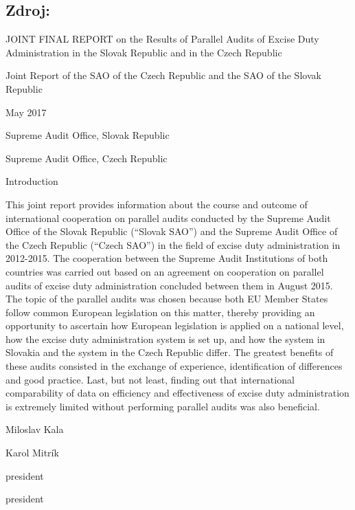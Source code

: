 \documentclass[10pt]{article}
\begin{document}
\subsection*{Zdroj:}



JOINT FINAL REPORT on the Results of Parallel Audits of Excise Duty Administration in the Slovak Republic and in the Czech Republic



Joint Report of the SAO of the Czech Republic and the SAO of the Slovak Republic



May 2017



Supreme Audit Office, Slovak Republic



Supreme Audit Office, Czech Republic



Introduction

This joint report provides information about the course and outcome of international cooperation on parallel audits conducted by the Supreme Audit Office of the Slovak Republic (“Slovak SAO”) and the Supreme Audit Office of the Czech Republic (“Czech SAO”) in the field of excise duty administration in 2012-2015.
The cooperation between the Supreme Audit Institutions of both countries was carried out based on an agreement on cooperation on parallel audits of excise duty administration concluded between them in August 2015.
The topic of the parallel audits was chosen because both EU Member States follow common European legislation on this matter, thereby providing an opportunity to ascertain how European legislation is applied on a national level, how the excise duty administration system is set up, and how the system in Slovakia and the system in the Czech Republic differ.
The greatest benefits of these audits consisted in the exchange of experience, identification of differences and good practice.
Last, but not least, finding out that international comparability of data on efficiency and effectiveness of excise duty administration is extremely limited without performing parallel audits was also beneficial.


Miloslav Kala



Karol Mitrík



president



president
\end{document}

